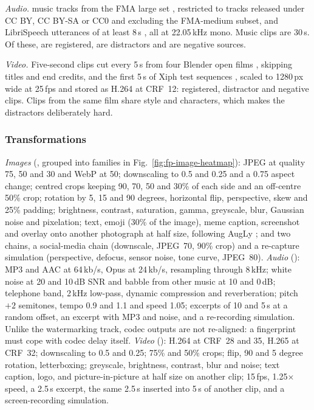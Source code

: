 \emph{Audio.}  music tracks from the FMA large set \cite{defferrard2017fma}, restricted to tracks released under CC BY, CC BY-SA or CC0 and excluding the FMA-medium subset, and  LibriSpeech utterances of at least 8\,s \cite{panayotov2015librispeech}, all at 22.05\,kHz mono. Music clips are 30\,s. Of these,  are registered,  are distractors and  are negative sources.

\emph{Video.} Five-second clips cut every 5\,s from four Blender open films \cite{blender2010sintel, blender2008bbb, blender2012tos, blender2006ed}, skipping titles and end credits, and the first 5\,s of  Xiph test sequences \cite{xiphderf}, scaled to 1280\,px wide at 25\,fps and stored as H.264 at CRF~12:  registered,  distractor and  negative clips. Clips from the same film share style and characters, which makes the distractors deliberately hard.

\subsubsection{Transformations}
\emph{Images} (, grouped into families in Fig.~\ref{fig:fp-image-heatmap}): JPEG at quality 75, 50 and 30 and WebP at 50; downscaling to 0.5 and 0.25 and a 0.75 aspect change; centred crops keeping 90, 70, 50 and 30\% of each side and an off-centre 50\% crop; rotation by 5, 15 and 90 degrees, horizontal flip, perspective, skew and 25\% padding; brightness, contrast, saturation, gamma, greyscale, blur, Gaussian noise and pixelation; text, emoji (30\% of the image), meme caption, screenshot and overlay onto another photograph at half size, following AugLy \cite{papakipos2022augly}; and two chains, a social-media chain (downscale, JPEG~70, 90\% crop) and a re-capture simulation (perspective, defocus, sensor noise, tone curve, JPEG~80). \emph{Audio} (): MP3 and AAC at 64\,kb/s, Opus at 24\,kb/s, resampling through 8\,kHz; white noise at 20 and 10\,dB SNR and babble from other music at 10 and 0\,dB; telephone band, 2\,kHz low-pass, dynamic compression and reverberation; pitch $+2$ semitones, tempo 0.9 and 1.1 and speed 1.05; excerpts of 10 and 5\,s at a random offset, an excerpt with MP3 and noise, and a re-recording simulation. Unlike the watermarking track, codec outputs are not re-aligned: a fingerprint must cope with codec delay itself. \emph{Video} (): H.264 at CRF~28 and 35, H.265 at CRF~32; downscaling to 0.5 and 0.25; 75\% and 50\% crops; flip, 90 and 5 degree rotation, letterboxing; greyscale, brightness, contrast, blur and noise; text caption, logo, and picture-in-picture at half size on another clip; 15\,fps, 1.25$\times$ speed, a 2.5\,s excerpt, the same 2.5\,s inserted into 5\,s of another clip, and a screen-recording simulation.

